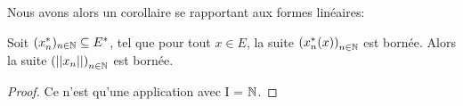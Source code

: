 Nous avons alors un corollaire se rapportant aux formes linéaires:

\begin{corollary}
	Soit $(x^{*}_{n})_{n \in \mathbb{N}} \subseteq E^{*}$, tel que pour
	tout $x \in E$, la suite ${(x_{n}^{*}(x))}_{n \in \mathbb{N}}$ est bornée. Alors
	la suite ${(||x_{n}||)}_{n \in \mathbb{N}}$ est bornée.
\end{corollary}

\begin{proof}
	Ce n'est qu'une application avec I = $\mathbb{N}$.
\end{proof}
